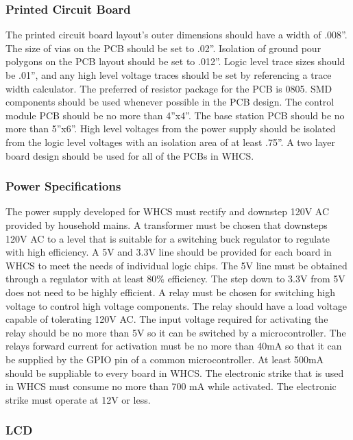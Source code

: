 \subsubsection{Printed Circuit Board}

The printed circuit board layout{}'s outer dimensions should have a width of
.008''. The size of vias on the PCB should be set to .02''. Isolation of ground
pour polygons on the PCB layout should be set to .012''. Logic level trace
sizes should be .01'', and any high level voltage traces should be set by
referencing a trace width calculator. The preferred of resistor package for the
PCB is 0805. SMD components should be used whenever possible in the PCB design.
The control module PCB should be no more than 4''x4''. The base station PCB
should be no more than 5''x6''. High level voltages from the power supply
should be isolated from the logic level voltages with an isolation area of at
least .75''. A two layer board design should be used for all of the PCBs in
WHCS.

\subsubsection{Power Specifications}

The power supply developed for WHCS must rectify and downstep 120V AC provided
by household mains. A transformer must be chosen that downsteps 120V AC to a
level that is suitable for a switching buck regulator to regulate with high
efficiency. A 5V and 3.3V line should be provided for each board in WHCS to
meet the needs of individual logic chips.  The 5V line must be obtained through
a regulator with at least 80\% efficiency. The step down to 3.3V from 5V does
not need to be highly efficient. A relay must be chosen for switching high
voltage to control high voltage components. The relay should have a load
voltage capable of tolerating 120V AC. The input voltage required for
activating the relay should be no more than 5V so it can be switched by a
microcontroller. The relays forward current for activation must be no more than
40mA so that it can be supplied by the GPIO pin of a common microcontroller. At
least 500mA should be suppliable to every board in WHCS. The electronic strike
that is used in WHCS must consume no more than 700 mA while activated. The
electronic strike must operate at 12V or less.

\subsubsection{LCD}

